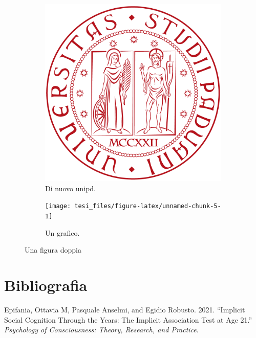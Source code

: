 \documentclass[
]{article}
\newlength{\cslhangindent}
\newlength{\cslentryspacingunit} %
\newenvironment{CSLReferences}[2] %
 {%
  \setlength{\parindent}{0pt}
  \ifodd #1
  \let\oldpar\par
  \def\par{\hangindent=\cslhangindent\oldpar}
  \fi
  \setlength{\parskip}{#2\cslentryspacingunit}
 }%
 {}
\begin{document}
\begin{figure}
\centering
\begin{subfigure}{0.3\textwidth}

\begin{center}\includegraphics[width=0.5\linewidth]{unipd} \end{center}
\caption{Di nuovo unipd.}
\label{sub:unipd1}
\end{subfigure}
\begin{subfigure}{0.3\textwidth}

\begin{center}\texttt{[image: tesi\_files/figure-latex/unnamed-chunk-5-1]} \end{center}
\caption{Un grafico.}
\label{sub:grafico}
\end{subfigure}
\caption{Una figura doppia}
\label{fig:doppia}
\end{figure}

\newpage

\hypertarget{bibliografia}{%
\section*{Bibliografia}\label{bibliografia}}

\hypertarget{refs}{}
\begin{CSLReferences}{1}{0}
\leavevmode{}%
Epifania, Ottavia M, Pasquale Anselmi, and Egidio Robusto. 2021.
{``Implicit Social Cognition Through the Years: The Implicit Association
Test at Age 21.''} \emph{Psychology of Consciousness: Theory, Research,
and Practice}.

\end{CSLReferences}
\end{document}
